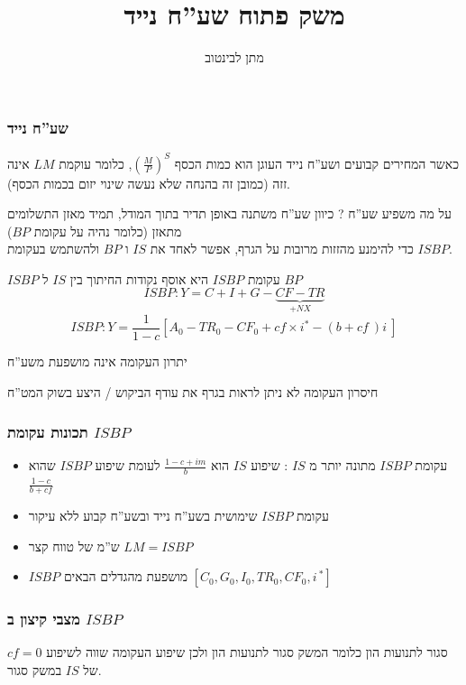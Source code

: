 \documentclass[10pt,usenames,dvipsnames]{beamer}
\title[]{משק פתוח שע''ח נייד}
\author{מתן לבינטוב}
\institute[{{ אב"ג}}]{{ אוניברסיטת בן גוריון בנגב}}
\date{}
\begin{document}
\begin{RTL}
\begin{frame}
\titlepage
\end{frame}
\begin{frame}[allowframebreaks]
    \frametitle{שע''ח נייד}
    כאשר המחירים קבועים ושע''ח נייד העוגן הוא כמות הכסף $\left(\frac{M}{P}\right)^S$, כלומר עוקמת $LM$ אינה זזה (כמובן זה בהנחה שלא נעשה שינוי יזום בכמות הכסף).
    \begin{block}{על מה משפיע שע''ח ?}
        כיוון שע''ח משתנה באופן תדיר בתוך המודל, תמיד מאזן התשלומים מתאזן (כלומר נהיה על עקומת $BP$) \\
        כדי להימנע מהזזות מרובות על הגרף, אפשר לאחד את $IS$ ו $BP$ ולהשתמש בעקומת $ISBP$.
    \end{block}


    \framebreak

    \begin{block}{$ISBP$}
        עקומת $ISBP$ היא אוסף נקודות החיתוך בין $IS$ ל $BP$
        $$ISBP : Y = C + I + G  - \underbrace{CF - TR}_{+NX}$$
        $$ISBP : Y =  \frac{1}{1-c} \left[A_0 - TR_0 - CF_0 + cf \times i^* - \left(b+cf \ \right)i \ \right]$$
    \end{block}
    \begin{exampleblock}{יתרון העקומה}
        אינה מושפעת משע''ח 
    \end{exampleblock}
    \begin{alertblock}{חיסרון העקומה}
        לא ניתן לראות בגרף את עודף הביקוש / היצע בשוק המט''ח
    \end{alertblock}    
\end{frame}
\begin{frame}[allowframebreaks]
    \frametitle{תכונות עקומת $ISBP$}
    \begin{itemize}
        \item עקומת $ISBP$ מתונה יותר מ $IS$ : שיפוע $IS$ הוא $\frac{1-c+im}{b}$ לעומת שיפוע $ISBP$ שהוא $\frac{1-c}{b + cf}$
        \item עקומת $ISBP$ שימושית בשע''ח נייד ובשע''ח קבוע ללא עיקור
        \item ש''מ של טווח קצר $LM = ISBP$
        \item $ISBP$ מושפעת מהגדלים הבאים $\left[C_0, G_0, I_0, TR_0 , CF_0, i^{\ *}  \right]$
    \end{itemize}

    

\end{frame}

\begin{frame}
    \frametitle{מצבי קיצון ב $ISBP$}
    \begin{block}{$cf = 0$ סגור לתנועות הון}
        כלומר המשק סגור לתנועות הון ולכן שיפוע העקומה שווה לשיפוע של $IS$ במשק סגור.
        

\end{block}
\end{frame}
\end{RTL}
\end{document}
